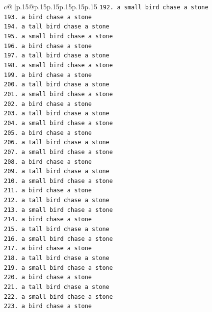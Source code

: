 \documentclass{article}
\begin{document}
{\begin{supertabular}{c@{$\;$}|p{.15\linewidth}@{}p{.15\linewidth}p{.15\linewidth}p{.15\linewidth}p{.15\linewidth}p{.15\linewidth}}
{{{\texttt{192. a small bird chase a stone} \\
\texttt{193. a bird chase a stone} \\
\texttt{194. a tall bird chase a stone} \\
\texttt{195. a small bird chase a stone} \\
\texttt{196. a bird chase a stone} \\
\texttt{197. a tall bird chase a stone} \\
\texttt{198. a small bird chase a stone} \\
\texttt{199. a bird chase a stone} \\
\texttt{200. a tall bird chase a stone} \\
\texttt{201. a small bird chase a stone} \\
\texttt{202. a bird chase a stone} \\
\texttt{203. a tall bird chase a stone} \\
\texttt{204. a small bird chase a stone} \\
\texttt{205. a bird chase a stone} \\
\texttt{206. a tall bird chase a stone} \\
\texttt{207. a small bird chase a stone} \\
\texttt{208. a bird chase a stone} \\
\texttt{209. a tall bird chase a stone} \\
\texttt{210. a small bird chase a stone} \\
\texttt{211. a bird chase a stone} \\
\texttt{212. a tall bird chase a stone} \\
\texttt{213. a small bird chase a stone} \\
\texttt{214. a bird chase a stone} \\
\texttt{215. a tall bird chase a stone} \\
\texttt{216. a small bird chase a stone} \\
\texttt{217. a bird chase a stone} \\
\texttt{218. a tall bird chase a stone} \\
\texttt{219. a small bird chase a stone} \\
\texttt{220. a bird chase a stone} \\
\texttt{221. a tall bird chase a stone} \\
\texttt{222. a small bird chase a stone} \\
\texttt{223. a bird chase a stone} \\
}}}
\end{supertabular}}
\end{document}
